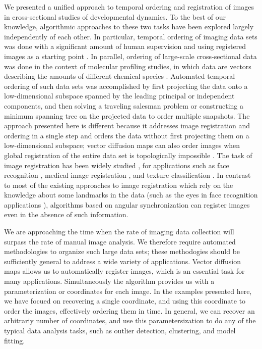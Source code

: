 \documentclass{pnastwo}
\begin{document}
\begin{article}
\begin{itemize}
\end{itemize}
We presented a unified approach to temporal ordering and registration of images in cross-sectional studies of developmental dynamics. 
%
To the best of our knowledge, algorithmic approaches to these two tasks have been explored largely independently of each other. 
%
In particular, temporal ordering of imaging data sets was done with a significant amount of human supervision and using registered images as a starting point \cite{yuan2014automated, surkova2008characterization}.  
%
In parallel, ordering of large-scale cross-sectional data was done in the context of molecular profiling studies, in which data are vectors describing the amounts of different chemical species \cite{anavy2014blind, trapnell2014dynamics, gupta2008extracting}. 
%
Automated temporal ordering of such data sets was accomplished by first projecting the data onto a low-dimensional subspace spanned by the leading principal or independent components, and then solving a traveling salesman problem or constructing a minimum spanning tree on the projected data to order multiple snapshots. 
%
The approach presented here is different because it addresses image registration and ordering in a single step and orders the data without first projecting them on a low-dimensional subspace; vector diffusion maps can also order images when global registration of the entire data set is topologically impossible \cite{zhao2014rotationally}.
%
The task of image registration has been widely studied \cite{zitova2003image}, for applications such as face recognition \cite{rowley1998rotation}, medical image registration \cite{hajnal2010medical}, and texture classification \cite{greenspan1994rotation}.
%
In contrast to most of the existing approaches to image registration which rely on the knowledge about some landmarks in the data \cite{ian1998statistical} (such as the eyes in face recognition applications \cite{zhao2003face}), algorithms based on angular synchronization can register images even in the absence of such information. 

We are approaching the time when the rate of imaging data collection will surpass the rate of manual image analysis. 
%
We therefore require automated methodologies to organize such large data sets; these methodogies should be sufficiently general to address a wide variety of applications. 
%
Vector diffusion maps allows us to automatically register images, which is an essential task for many applications.
%
Simultaneously the algorithm provides us with a parameterization or coordinates for each image.
%
In the examples presented here, we have focued on recovering a single coordinate, and using this coordinate to order the images, effectively ordering them in time.
%
In general, we can recover an arbitrariy number of coordinates, and use this parametersization to do any of the typical data analysis tasks, such as outlier detection, clustering, and model fitting. 



\end{article}
\end{document}
